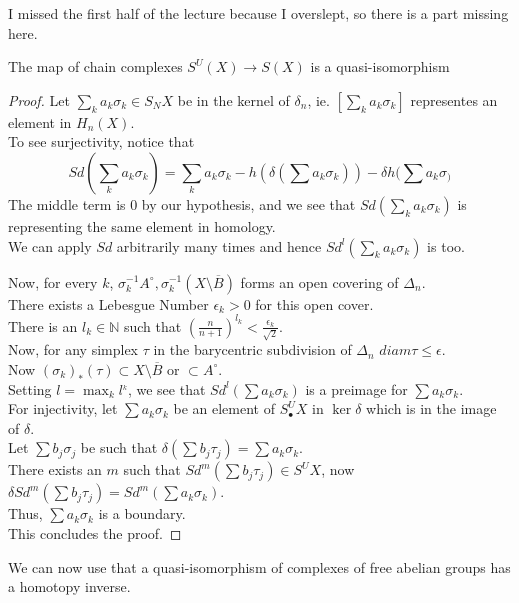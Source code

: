 \documentclass[../main.tex]{subfiles}
\begin{document}
I missed the first half of the lecture because I overslept, so there is a part missing here.
\begin{lemma}
The map of chain complexes $S^{U}( X) \to S( X) $ is a quasi-isomorphism
\end{lemma}
\begin{proof}
Let $ \sum_{k}^{ } a_k \sigma_k\in S_N X $ be in the kernel of $\delta_n$, ie. $ [ \sum_k a_k \sigma_k] $ representes an element in $H_n( X) $.\\
To see surjectivity, notice that
\[ 
Sd( \sum_k a_k \sigma_k) = \sum_k a_k\sigma_k - h( \delta( \sum a_k \sigma_k) ) - \delta h( \sum a_k \sigma_) 
\]
The middle term is 0 by our hypothesis, and we see that $Sd( \sum_k a_k\sigma_k) $ is representing the same element in homology.\\
We can apply $Sd$ arbitrarily many times and hence $Sd^{l}( \sum_k a_k\sigma_k) $ is too.

Now, for every $k$, $\sigma_k^{-1}A^{\circ}, \sigma_k^{-1}( X\setminus \overline{B}) $ forms an open covering of $\Delta_n$.\\
There exists a Lebesgue Number $\epsilon_k>0$ for this open cover.\\
There is an $l_k \in \mathbb{N}$ such that $( \frac{n}{n+1})^{l_k}< \frac{\epsilon_k}{ \sqrt{2} }$.\\
Now, for any simplex $\tau$ in the barycentric subdivision of $\Delta_n$  $diam \tau \leq \epsilon$.\\
Now $( \sigma_k)_\ast ( \tau)  \subset X\setminus \overline{B}$ or $ \subset A^{\circ}$.\\
Setting $l= \max_k l^{_k}$, we see that $Sd^{l}( \sum a_k \sigma_k) $ is a preimage for $\sum a_k \sigma_k$.\\
For injectivity, let $\sum a_k \sigma_k$ be an element of $S^{U}_\bullet X$ in $\ker \delta$ which is in the image of $\delta$.\\
Let $\sum b_j \sigma_j $ be such that $\delta( \sum b_j \tau_j ) = \sum a_k \sigma_k $.\\
There exists an $m$ such that $Sd^{m}( \sum b_j \tau_j )\in S^{U}X $, now $\delta Sd^{m}( \sum b_j \tau_j ) = Sd^{m}( \sum a_k \sigma_k ) $.\\
Thus, $\sum a_k \sigma_k$ is a boundary.\\
This concludes the proof.
\end{proof}
We can now use that a quasi-isomorphism of complexes of free abelian groups has a homotopy inverse.
\end{document}
